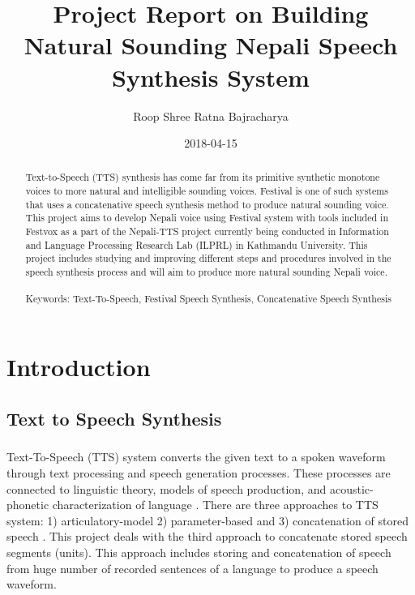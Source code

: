 \documentclass{report}
\title{Project Report on Building Natural Sounding Nepali Speech Synthesis System}
\date{2018-04-15}
\author{Roop Shree Ratna Bajracharya}
\begin{document}
	
	\maketitle
	\newpage

	\tableofcontents
	\newpage

	
	\begin{abstract}
		Text-to-Speech (TTS) synthesis has come far from its primitive synthetic monotone voices to more natural and intelligible sounding voices. Festival is one of such systems that uses a concatenative speech synthesis method to produce natural sounding voice. This project aims to develop Nepali voice using Festival system with tools included in Festvox as a part of the Nepali-TTS project currently being conducted in Information and Language Processing Research Lab (ILPRL) in Kathmandu University. This project includes studying and improving different steps and procedures involved in the speech synthesis process and will aim to produce more natural sounding Nepali voice.
		\paragraph{}
		Keywords: Text-To-Speech, Festival Speech Synthesis, Concatenative Speech Synthesis
	\end{abstract}
	\newpage
	
	\chapter{Introduction}
		\section{Text to Speech Synthesis}
		\paragraph{}
		Text-To-Speech (TTS) system converts the given text to a spoken waveform through text processing and speech generation processes. These processes are connected to linguistic theory, models of speech production, and acoustic-phonetic characterization of language \cite{ReviewOfTTS:1}. There are three approaches to TTS system: 1) articulatory-model 2) parameter-based  and 3) concatenation of stored speech \cite{ReviewOfTTS:1}. This project deals with the third approach to concatenate stored speech segments (units). This approach includes storing and concatenation of speech from huge number of recorded sentences of a language to produce a speech waveform. 
	
\end{document}
